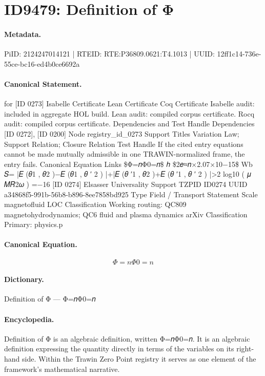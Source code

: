 \section*{ID9479: Definition of Φ}
\paragraph{Metadata.}
PiID: 2124247014121 | RTEID: RTE:P36809.0621:T4.1013 | UUID: 12ff1c14-736e-55ce-bc16-ed4b0ce6692a

\paragraph{Canonical Statement.}
for [ID 0273] Isabelle Certificate Lean Certificate Coq Certificate Isabelle audit: included in aggregate HOL build. Lean audit: compiled corpus certificate. Rocq audit: compiled corpus certificate. Dependencies and Test Handle Dependencies [ID 0272], [ID 0200] Node registry\_id\_0273 Support Titles Variation Law; Support Relation; Closure Relation Test Handle If the cited entry equations cannot be made mutually admissible in one TRAWIN-normalized frame, the entry fails. Canonical Equation Links \$Φ=𝑛Φ0=𝑛\$ ℎ \$2𝑒≈𝑛×2.07×10−15\$ Wb 𝑆= |𝐸 (𝜃1 , 𝜃2 )−𝐸 (𝜃1 , 𝜃 ′ 2 ) |+|𝐸 (𝜃 ′1 , 𝜃2 )+𝐸 (𝜃 ′1 , 𝜃 ′ 2 ) |>2 log10 ( 𝜇 𝑀𝑅2𝜔 ) =−16 [ID 0274] Elsasser Universality Support TZPID ID0274 UUID a34868f5-991b-56b8-b896-8ee7858bd925 Type Field / Transport Statement Scale magnetofluid LOC Classification Working routing: QC809 magnetohydrodynamics; QC6 fluid and plasma dynamics arXiv Classification Primary: physics.p

\paragraph{Canonical Equation.}
\[
Φ=𝑛Φ0=𝑛
\]

\paragraph{Dictionary.}
Definition of Φ — Φ=𝑛Φ0=𝑛

\paragraph{Encyclopedia.}
Definition of Φ is an algebraic definition, written Φ=𝑛Φ0=𝑛. It is an algebraic definition expressing the quantity directly in terms of the variables on its right-hand side. Within the Trawin Zero Point registry it serves as one element of the framework's mathematical narrative.

